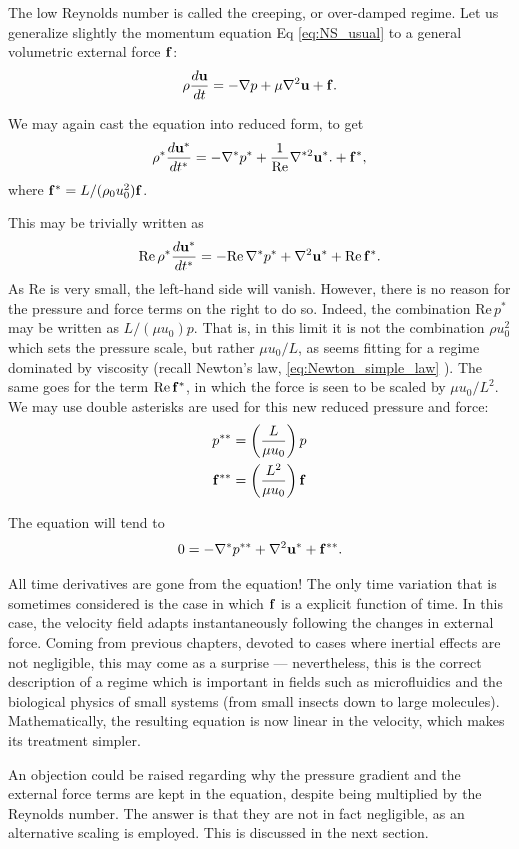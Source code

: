 The low Reynolds number is called the creeping, or over-damped
regime. Let us generalize slightly the momentum equation
Eq \ref{eq:NS_usual} to a general volumetric external force $\mathbf{f}$:
\[
  \rho \frac{d\mathbf{u} }{dt} =
  - \nabla p 
  + \mu \nabla^2 \mathbf{u}
  + \mathbf{f} .
\]

We may again cast the equation into reduced form, to get
\[
\rho^* \frac{d\mathbf{u}^* }{dt^* } =
-  \nabla^* p^*
+  \frac1{\mathrm{Re}} \nabla^{*2} \mathbf{u}^* .
+  \mathbf{f}^* ,
\]
where $\mathbf{f}^*= L/(\rho_0 u_0^2) \mathbf{f}$. 

This may be trivially written as
\[
\mathrm{Re}\,
\rho^* \frac{d\mathbf{u}^* }{dt^* }
 = - \mathrm{Re}\, \nabla^* p^* + \nabla^2 \mathbf{u}^* + \mathrm{Re}\,\mathbf{f}^*
.
\]
As $\mathrm{Re}$ is very small, the left-hand side will vanish. However,
there is no reason for the pressure and force terms on the right to
do so. Indeed, the combination $\mathrm{Re}\, p^*$ may
be written as $L / (\mu u_0 ) p $. That is, in this limit it is not the
combination $\rho u_0^2$ which sets the pressure scale, but rather
$\mu u_0 / L$, as seems fitting for a regime dominated by viscosity
(recall Newton's law, \ref{eq:Newton_simple_law} ). The same goes for the
term $\mathrm{Re}\,\mathbf{f}^*$, in which the force is seen to be scaled
by $\mu u_0 / L^2$.
We may use double asterisks are used for this new reduced pressure and
force:
\begin{align*}
   p^{**} &= \left( \frac{L  }{\mu u_0 }\right) p \\
\mathbf{f}^{**} &= \left( \frac{L^2}{\mu u_0 }\right) \mathbf{f} 
\end{align*}



The equation will tend to
\[
0 = - \nabla^* p^{**} + \nabla^2 \mathbf{u}^* + \mathbf{f}^{**} .
\]


All time derivatives are gone from the equation! The only time
variation that is sometimes considered is the case in which $\mathbf{f}$
is a explicit function of time. In this case, the velocity field
adapts instantaneously following the changes in external force. Coming
from previous chapters, devoted to cases where inertial effects are
not negligible, this may come as a surprise --- nevertheless, this is
the correct description of a regime which is important in fields such
as microfluidics and the biological physics of small systems (from
small insects down to large molecules).  Mathematically, the resulting
equation is now linear in the velocity, which makes its treatment
simpler.

An objection could be raised regarding why the pressure gradient and
the external force terms are kept in the equation, despite being
multiplied by the Reynolds number. The answer is that they are not
in fact negligible, as an alternative scaling is employed. This is
discussed in the next section.




